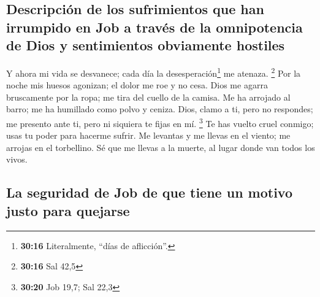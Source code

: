 \hypertarget{descripciuxf3n-de-los-sufrimientos-que-han-irrumpido-en-job-a-travuxe9s-de-la-omnipotencia-de-dios-y-sentimientos-obviamente-hostiles}{%
\subsection{Descripción de los sufrimientos que han irrumpido en Job a
través de la omnipotencia de Dios y sentimientos obviamente
hostiles}\label{descripciuxf3n-de-los-sufrimientos-que-han-irrumpido-en-job-a-travuxe9s-de-la-omnipotencia-de-dios-y-sentimientos-obviamente-hostiles}}

 Y ahora mi vida se desvanece; cada día la
desesperación\footnote{\textbf{30:16} Literalmente, ``días de
  aflicción''.} me atenaza. \footnote{\textbf{30:16} Sal 42,5}
 Por la noche mis huesos agonizan; el dolor me roe y no
cesa.  Dios me agarra bruscamente por la ropa; me tira
del cuello de la camisa.  Me ha arrojado al barro; me ha
humillado como polvo y ceniza.  Dios, clamo a ti, pero no
respondes; me presento ante ti, pero ni siquiera te fijas en mí.
\footnote{\textbf{30:20} Job 19,7; Sal 22,3}  Te has
vuelto cruel conmigo; usas tu poder para hacerme sufrir. 
Me levantas y me llevas en el viento; me arrojas en el torbellino.
 Sé que me llevas a la muerte, al lugar donde van todos
los vivos.

\hypertarget{la-seguridad-de-job-de-que-tiene-un-motivo-justo-para-quejarse}{%
\subsection{La seguridad de Job de que tiene un motivo justo para
quejarse}\label{la-seguridad-de-job-de-que-tiene-un-motivo-justo-para-quejarse}}

